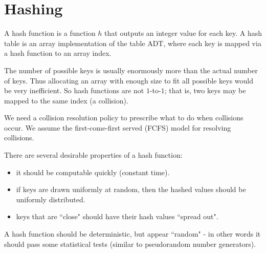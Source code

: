 

\chapter{Hashing} %

\begin{Definition}
A {hash function} is a function $h$ that outputs an integer
value for each key. A {hash table} is an array implementation of
the table ADT, where each key is mapped via a hash function to an array
index. 
\end{Definition}

The number of possible keys is usually enormously more than
the actual number of keys. Thus allocating an array with enough size to
fit all possible keys would be very inefficient. So hash functions are
not $1$-to-$1$; that is, two keys may be mapped to the same index (a
{collision}). 

We need a collision resolution policy to prescribe what to do when 
collisions occur. We assume the first-come-first served (FCFS) model for resolving
collisions.

There are several desirable properties of a hash function:
\begin{itemize}
\item it should be computable quickly (constant time).
\item if keys are drawn uniformly at random, then the hashed values
should be uniformly distributed. 
\item keys that are ``close" should have their hash values ``spread out". 
\end{itemize}
A hash function should be deterministic, but appear ``random" - in other 
words it should pass some statistical tests (similar to pseudorandom number generators). 

